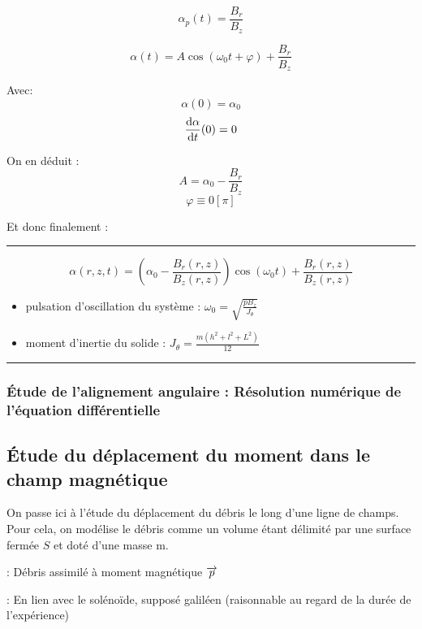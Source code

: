 \documentclass{report}
\begin{document}

$$\alpha_p(t) = \frac{B_r}{B_z}$$



$$\alpha(t) = A \cos(\omega_0 t + \varphi) + \frac{B_r}{B_z}$$


Avec:
$$\alpha(0) = \alpha_0$$
$$\frac{\mathrm{d}\alpha}{\mathrm{d}t} (0) = 0$$

On en déduit : 
$$A = \alpha_0  - \frac{B_r}{B_z}$$
$$\varphi \equiv 0 \left[\pi\right] $$ 

Et donc finalement :\newpage

\rule{\textwidth}{0.4pt}
\begin{center}
    $$\alpha(r,z,t) = \left(\alpha_0  - \frac{B_r(r,z)}{B_z(r,z)}\right) \cos(\omega_0 t) + \frac{B_r(r,z)}{B_z(r,z)}$$    

\begin{itemize}
    \item pulsation d'oscillation du système : $\omega_0 = \sqrt{\frac{pB_z}{J_\theta}}$
    \item moment d'inertie du solide : $J_\theta = \frac{m(h^2+l^2+L^2)}{12}$
\end{itemize}
\end{center}

\rule{\textwidth}{0.4pt}

\subsubsection{Étude de l'alignement angulaire : Résolution numérique de l'équation différentielle}

\subsection{Étude du déplacement du moment dans le champ magnétique}

On passe ici à l'étude du déplacement du débris le long d'une ligne de champs. Pour cela, on modélise le débris comme un volume étant délimité par une surface fermée $S$ et doté d'une masse m.

: {Débris assimilé à moment magnétique $\overrightarrow{p}$}

: En lien avec le solénoïde, supposé galiléen (raisonnable au regard de la durée de l'expérience)
\end{document}
